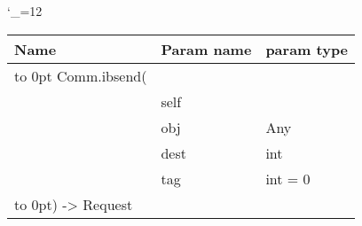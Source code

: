 \begingroup \catcode`\_=12 \tt
\begin{tabular}{lll}
\toprule
\textrm{Name}&\textrm{Param name}&\textrm{param type}\\
\midrule
\hbox to 0pt {Comm.ibsend(\hss}\\
& self\\
& obj & Any\\
& dest & int\\
& tag & int = 0\\
\hbox to 0pt{) -> Request\hss}\\
\bottomrule
\end{tabular}
\endgroup

